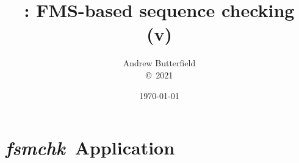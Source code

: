\documentclass[fleqn,10pt]{report}
\author{
Andrew Butterfield
\\
{\small \copyright\ 2021}
}
\title{
  \FSMcheck: FMS-based sequence checking
  \\(v\FSMcheckVersion)
}
\date{
\today
}
\def\FSMcheck{\textit{\textsf{fsmchk}}}
\begin{document}
\maketitle
\tableofcontents


\chapter{\FSMcheck\ Application}



%
% 
%
%



\end{document}
